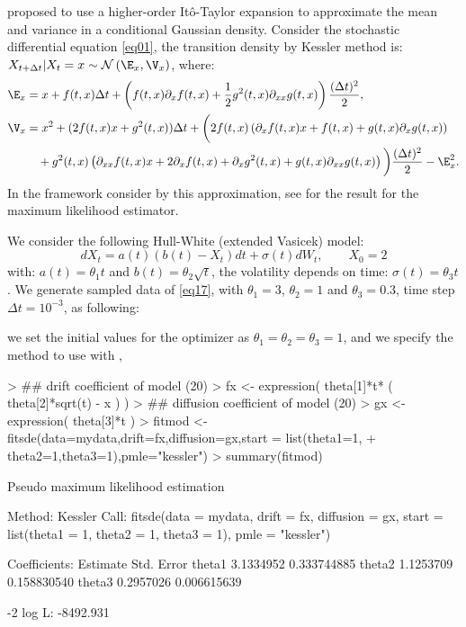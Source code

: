 \citet{Kessler1997} proposed to use a higher-order It\^{o}-Taylor expansion to approximate the mean and variance in a conditional Gaussian density. Consider the stochastic differential equation \eqref{eq01}, the transition density by Kessler method is: $X_{t+\Delta t}|X_{t} = x \sim \mathcal{N}\left(\E_{x},\V_{x}\right)$, where:
\begin{align}\label{eq16}
  \E_{x} &= x + f(t,x) \Delta t+\left(f(t,x)\partial_{x}f(t,x) + \frac{1}{2} g^{2}(t,x) \partial_{xx}g(t,x)\right)\frac{(\Delta t)^2}{2}, \\
  \V_{x} &= x^2 +(2f(t,x)x+g^{2}(t,x)) \Delta t +\bigg(2f(t,x)\left(\partial_{x}f(t,x)x+f(t,x)+g(t,x)\partial_{x}g(t,x)\right) \nonumber\\
         &\quad+g^{2}(t,x)\left(\partial_{xx}f(t,x)x+2\partial_{x}f(t,x)+\partial_{x}g^{2}(t,x)+g(t,x)\partial_{xx}g(t,x)\right)\bigg)\frac{(\Delta t)^2}{2}-\E^{2}_{x}.
\end{align}
In the framework consider by this approximation, see \citet{Kessler1997} for the result  for the maximum likelihood estimator.

We consider the following Hull-White (extended Vasicek) model:
\begin{equation}\label{eq17}
  dX_{t} = a(t)(b(t)-X_{t}) dt + \sigma(t) dW_{t},\qquad X_{0}=2
\end{equation}
with: $a(t) = \theta_{1}t$ and $b(t)=\theta_{2}\sqrt{t}$, the volatility depends on time: $\sigma(t)=\theta_{3}t$. We generate sampled data of \eqref{eq17}, with $\theta_{1}=3$, $\theta_{2}=1$ and $\theta_{3}=0.3$, time step $\Delta t =10^{-3}$, as following:
\begin{Schunk}
\end{Schunk}
we set the initial values for the optimizer as $\theta_{1}=\theta_{2}=\theta_{3}=1$, and we specify the method to use with ,
\begin{Schunk}
\begin{Sinput}
> ## drift coefficient of model (20)
> fx <- expression( theta[1]*t* ( theta[2]*sqrt(t) - x ) )
> ## diffusion coefficient of model (20)
> gx <- expression( theta[3]*t )
> fitmod <- fitsde(data=mydata,drift=fx,diffusion=gx,start = list(theta1=1,
+                  theta2=1,theta3=1),pmle="kessler")
> summary(fitmod)
\end{Sinput}
\begin{Soutput}
Pseudo maximum likelihood estimation

Method:  Kessler
Call:
fitsde(data = mydata, drift = fx, diffusion = gx, start = list(theta1 = 1,
    theta2 = 1, theta3 = 1), pmle = "kessler")

Coefficients:
        Estimate  Std. Error
theta1 3.1334952 0.333744885
theta2 1.1253709 0.158830540
theta3 0.2957026 0.006615639

-2 log L: -8492.931
\end{Soutput}
\end{Schunk}
